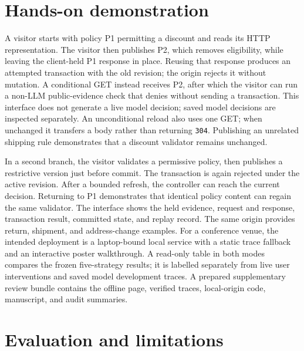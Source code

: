 \documentclass[sigconf,screen,review]{acmart}
\begin{document}
\section{Hands-on demonstration}
A visitor starts with policy P1 permitting a discount and reads its HTTP
representation. The visitor then publishes P2, which removes eligibility,
while leaving the client-held P1 response in place. Reusing that response
produces an attempted transaction with the old revision; the origin rejects
it without mutation. A conditional GET instead receives P2, after which the
visitor can run a non-LLM public-evidence check that denies without sending a
transaction. This interface does not generate a live model decision; saved
model decisions are inspected separately. An unconditional reload also uses
one GET; when unchanged it transfers a body rather than returning \texttt{304}.
Publishing an unrelated
shipping rule demonstrates that a discount validator remains unchanged.

In a second branch, the visitor validates a permissive policy, then publishes
a restrictive version just before commit. The transaction is again rejected
under the active revision. After a bounded refresh, the controller can reach
the current decision. Returning to P1 demonstrates that identical policy
content can regain the same validator. The interface shows the held evidence,
request and response, transaction result, committed state, and replay record.
The same origin provides return, shipment, and address-change examples. For a
conference venue, the intended deployment is a laptop-bound local service
with a static trace fallback and an interactive poster walkthrough. A
read-only table in both modes compares the frozen five-strategy results;
it is labelled separately from live user interventions and saved model
development traces. A prepared supplementary review bundle contains the offline
page, verified traces, local-origin code, manuscript, and audit summaries.

\section{Evaluation and limitations}
\end{document}
